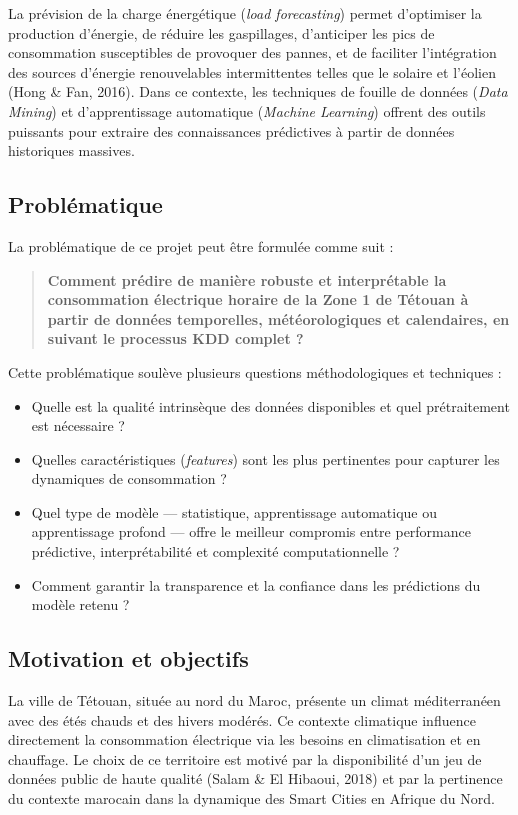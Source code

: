 \documentclass[12pt,a4paper]{article}
\begin{document}
La prévision de la charge énergétique (\textit{load forecasting}) permet d'optimiser la production d'énergie, de réduire les gaspillages, d'anticiper les pics de consommation susceptibles de provoquer des pannes, et de faciliter l'intégration des sources d'énergie renouvelables intermittentes telles que le solaire et l'éolien (Hong \& Fan, 2016). Dans ce contexte, les techniques de fouille de données (\textit{Data Mining}) et d'apprentissage automatique (\textit{Machine Learning}) offrent des outils puissants pour extraire des connaissances prédictives à partir de données historiques massives.

\subsection{Problématique}
La problématique de ce projet peut être formulée comme suit :
\begin{quote}
\textbf{Comment prédire de manière robuste et interprétable la consommation électrique horaire de la Zone 1 de Tétouan à partir de données temporelles, météorologiques et calendaires, en suivant le processus KDD complet ?}
\end{quote}

Cette problématique soulève plusieurs questions méthodologiques et techniques :
\begin{itemize}
    \item Quelle est la qualité intrinsèque des données disponibles et quel prétraitement est nécessaire ?
    \item Quelles caractéristiques (\textit{features}) sont les plus pertinentes pour capturer les dynamiques de consommation ?
    \item Quel type de modèle — statistique, apprentissage automatique ou apprentissage profond — offre le meilleur compromis entre performance prédictive, interprétabilité et complexité computationnelle ?
    \item Comment garantir la transparence et la confiance dans les prédictions du modèle retenu ?
\end{itemize}

\subsection{Motivation et objectifs}
La ville de Tétouan, située au nord du Maroc, présente un climat méditerranéen avec des étés chauds et des hivers modérés. Ce contexte climatique influence directement la consommation électrique via les besoins en climatisation et en chauffage. Le choix de ce territoire est motivé par la disponibilité d'un jeu de données public de haute qualité (Salam \& El Hibaoui, 2018) et par la pertinence du contexte marocain dans la dynamique des Smart Cities en Afrique du Nord.
\end{document}
